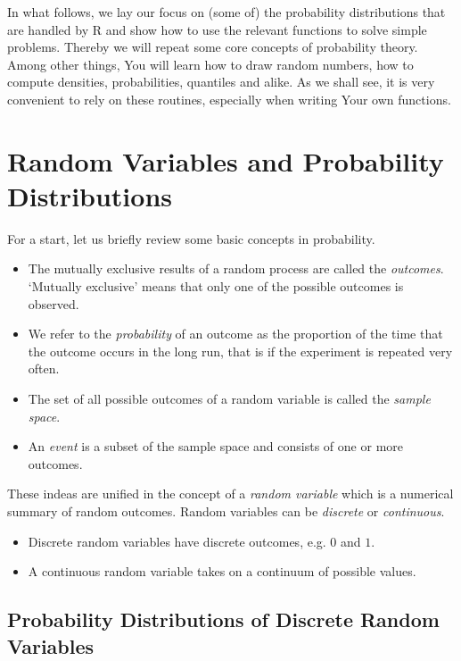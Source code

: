 \documentclass[]{book}
\providecommand{\tightlist}{%
  \setlength{\itemsep}{0pt}\setlength{\parskip}{0pt}}
\theoremstyle{definition}
\theoremstyle{definition}
\theoremstyle{definition}
\theoremstyle{remark}
\begin{document}
In what follows, we lay our focus on (some of) the probability
distributions that are handled by R and show how to use the relevant
functions to solve simple problems. Thereby we will repeat some core
concepts of probability theory. Among other things, You will learn how
to draw random numbers, how to compute densities, probabilities,
quantiles and alike. As we shall see, it is very convenient to rely on
these routines, especially when writing Your own functions.

\section{Random Variables and Probability
Distributions}\label{random-variables-and-probability-distributions}

For a start, let us briefly review some basic concepts in probability.

\begin{itemize}
\tightlist
\item
  The mutually exclusive results of a random process are called the
  \emph{outcomes}. `Mutually exclusive' means that only one of the
  possible outcomes is observed.
\item
  We refer to the \emph{probability} of an outcome as the proportion of
  the time that the outcome occurs in the long run, that is if the
  experiment is repeated very often.
\item
  The set of all possible outcomes of a random variable is called the
  \emph{sample space}.
\item
  An \emph{event} is a subset of the sample space and consists of one or
  more outcomes.
\end{itemize}

These indeas are unified in the concept of a \emph{random variable}
which is a numerical summary of random outcomes. Random variables can be
\emph{discrete} or \emph{continuous}.

\begin{itemize}
\tightlist
\item
  Discrete random variables have discrete outcomes, e.g. \(0\) and
  \(1\).
\item
  A continuous random variable takes on a continuum of possible values.
\end{itemize}

\subsection*{Probability Distributions of Discrete Random
Variables}\label{probability-distributions-of-discrete-random-variables}
\end{document}
